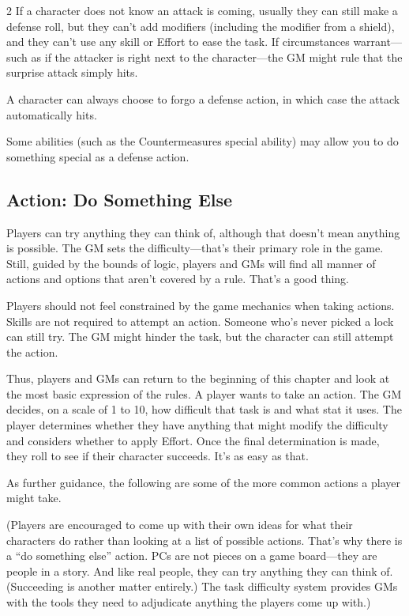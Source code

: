 \begin{multicols}{2}
If a character does not know an attack is coming, usually they can still make a defense roll, but they can’t add modifiers (including the modifier from a shield), and they can’t use any skill or Effort to ease the task. If circumstances warrant—such as if the attacker is right next to the character—the GM might rule that the surprise attack simply hits.

A character can always choose to forgo a defense action, in which case the attack automatically hits.

Some abilities (such as the Countermeasures special ability) may allow you to do something special as a defense action.

\subsection{Action: Do Something Else}

Players can try anything they can think of, although that doesn’t mean anything is possible. The GM sets the difficulty—that’s their primary role in the game. Still, guided by the bounds of logic, players and GMs will find all manner of actions and options that aren’t covered by a rule. That’s a good thing.

Players should not feel constrained by the game mechanics when taking actions. Skills are not required to attempt an action. Someone who’s never picked a lock can still try. The GM might hinder the task, but the character can still attempt the action.

Thus, players and GMs can return to the beginning of this chapter and look at the most basic expression of the rules. A player wants to take an action. The GM decides, on a scale of 1 to 10, how difficult that task is and what stat it uses. The player determines whether they have anything that might modify the difficulty and considers whether to apply Effort. Once the final determination is made, they roll to see if their character succeeds. It’s as easy as that.

As further guidance, the following are some of the more common actions a player might take.

(Players are encouraged to come up with their own ideas for what their characters do rather than looking at a list of possible actions. That’s why there is a “do something else” action. PCs are not pieces on a game board—they are people in a story. And like real people, they can try anything they can think of. (Succeeding is another matter entirely.) The task difficulty system provides GMs with the tools they need to adjudicate anything the players come up with.)


\end{multicols}

